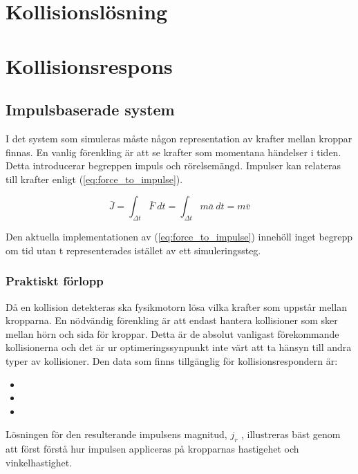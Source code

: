 \documentclass[a4paper,12pt,twopage,swedish]{article}
\begin{document}
\section{Kollisionslösning}
\section{Kollisionsrespons}
\subsection{Impulsbaserade system}
I det system som simuleras måste någon representation av krafter mellan kroppar finnas. En vanlig förenkling är att se krafter som momentana händelser i tiden. Detta introducerar begreppen impuls och rörelsemängd. Impulser kan relateras till krafter enligt (\ref{eq:force_to_impulse}).

\begin{equation}\label{eq:force_to_impulse}
\bar{J} = \int_{\Delta t}^{} \bar{F} \ dt = \int_{\Delta t}^{} m\bar{a} \ dt = m\bar{v}
\end{equation}

Den aktuella implementationen av (\ref{eq:force_to_impulse}) innehöll inget begrepp om tid utan t representerades istället av ett simuleringssteg.

\subsubsection{Praktiskt förlopp}
Då en kollision detekteras ska fysikmotorn lösa vilka krafter som uppstår mellan kropparna. En nödvändig förenkling är att endast hantera kollisioner som sker mellan hörn och sida för kroppar. Detta är de absolut vanligast förekommande kollisionerna och det är ur optimeringssynpunkt inte värt att ta hänsyn till andra typer av kollisioner. Den data som finns tillgänglig för kollisionsrespondern är:

\begin{itemize}
\item {}
\item {}
\item {}
\end{itemize}

Lösningen för den resulterande impulsens magnitud, $j_r$ , illustreras bäst genom att först förstå hur impulsen appliceras på kropparnas hastigehet och vinkelhastighet.
\end{document}
